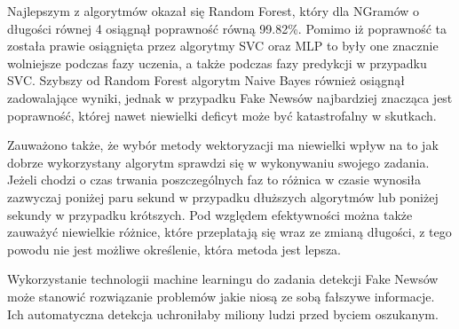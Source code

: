 Najlepszym z algorytmów okazał się Random Forest, który dla NGramów o długości równej 4
osiągnął poprawność równą 99.82\%. Pomimo iż poprawność ta została prawie osiągnięta przez algorytmy
SVC oraz MLP to były one znacznie wolniejsze podczas fazy uczenia, a także podczas fazy 
predykcji w przypadku SVC. Szybszy od Random Forest algorytm Naive Bayes również osiągnął zadowalające wyniki,
jednak w przypadku Fake Newsów najbardziej znacząca jest poprawność, której nawet niewielki deficyt
może być katastrofalny w skutkach.  

Zauważono także, że wybór metody wektoryzacji ma niewielki wpływ na to jak dobrze wykorzystany algorytm 
sprawdzi się w wykonywaniu swojego zadania. Jeżeli chodzi o czas trwania poszczególnych faz to 
różnica w czasie wynosiła zazwyczaj poniżej paru sekund w przypadku dłuższych algorytmów lub poniżej 
sekundy w przypadku krótszych. Pod względem efektywności można także zauważyć niewielkie różnice,
które przeplatają się
wraz ze zmianą długości, z tego powodu nie jest możliwe określenie, która metoda jest lepsza.

Wykorzystanie technologii machine learningu do zadania detekcji Fake Newsów 
może stanowić rozwiązanie problemów jakie niosą ze sobą fałszywe informacje. Ich automatyczna 
detekcja uchroniłaby miliony ludzi przed byciem oszukanym. 
